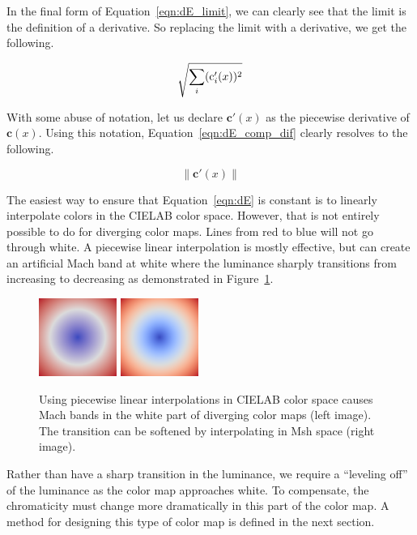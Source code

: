 \documentclass[review,journal]{vgtc}         %
\newcommand{\Lab}{CIELAB\xspace}
\newcommand{\Msh}{Msh\xspace}
\newcommand*{\cvec}[1]{\mathbf{#1}}
\begin{document}
In the final form of Equation~\ref{eqn:dE_limit}, we can clearly see that
the limit is the definition of a derivative.  So replacing the limit with a
derivative, we get the following.

\begin{equation}
  \sqrtsign{\sum_i (\operatorname{c}_{i}'(x))^2}
  \label{eqn:dE_comp_dif}
\end{equation}

With some abuse of notation, let us declare $\cvec{c}'(x)$ as the piecewise
derivative of $\cvec{c}(x)$.  Using this notation,
Equation~\ref{eqn:dE_comp_dif} clearly resolves to the following.

\begin{equation}
  \left\lVert \cvec{c}'(x) \right\rVert
  \label{eqn:dE}
\end{equation}

The easiest way to ensure that Equation~\ref{eqn:dE} is constant
is to linearly interpolate colors in the \Lab color space.  However, that
is not entirely possible to do for diverging color maps.  Lines from red to
blue will not go through white.  A piecewise linear interpolation is mostly
effective, but can create an artificial Mach band at white where the
luminance sharply transitions from increasing to decreasing as demonstrated
in Figure~\ref{fig:LinearMachBands}.

\begin{figure}
  \centering
  \includegraphics[width=1in]{images/Cool2WarmLabRadial}
  \qquad
  \includegraphics[width=1in]{images/Cool2WarmRadial}
  \caption{Using piecewise linear interpolations in \Lab color space causes
    Mach bands in the white part of diverging color maps (left image).  The
    transition can be softened by interpolating in \Msh space (right image).}
  \label{fig:LinearMachBands}
\end{figure}

Rather than have a sharp transition in the luminance, we require a
``leveling off'' of the luminance as the color map approaches white.  To
compensate, the chromaticity must change more dramatically in this part of
the color map.  A method for designing this type of color map is defined in
the next section.
\end{document}
